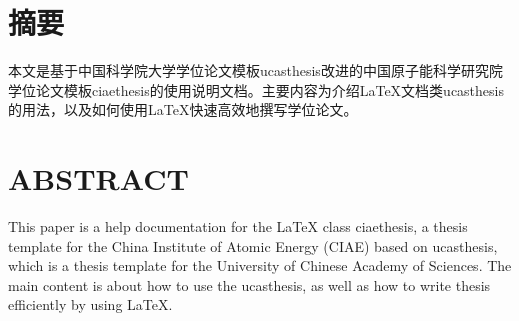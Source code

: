 \maketitle%
\intobmk\chapter*{摘\quad 要}%
\setcounter{page}{1}%

本文是基于中国科学院大学学位论文模板ucasthesis改进的中国原子能科学研究院学位论文模板ciaethesis的使用说明文档。主要内容为介绍\LaTeX{}文档类ucasthesis的用法，以及如何使用\LaTeX{}快速高效地撰写学位论文。

\intobmk\chapter*{ABSTRACT}%

This paper is a help documentation for the \LaTeX{} class ciaethesis, a thesis template for the China Institute of Atomic Energy (CIAE) based on ucasthesis, which is a thesis template for the University of Chinese Academy of Sciences. The main content is about how to use the ucasthesis, as well as how to write thesis efficiently by using \LaTeX{}.

